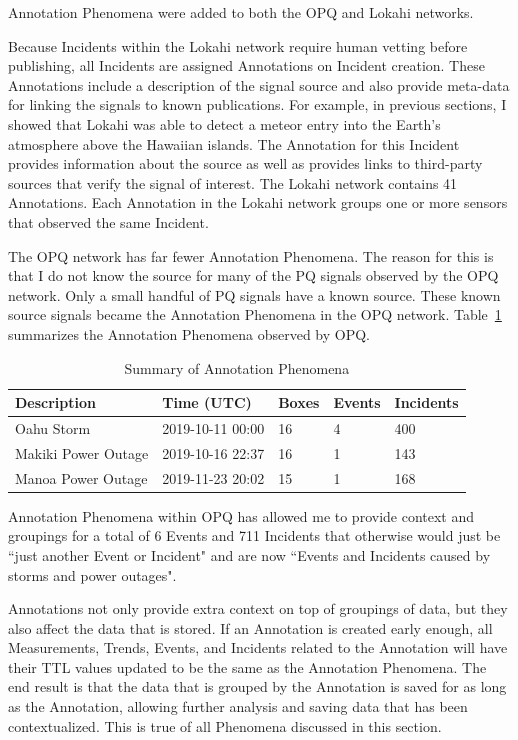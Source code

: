 Annotation Phenomena were added to both the OPQ and Lokahi networks.

Because Incidents within the Lokahi network require human vetting before publishing, all Incidents are assigned Annotations on Incident creation. These Annotations include a description of the signal source and also provide meta-data for linking the signals to known publications. For example, in previous sections, I showed that Lokahi was able to detect a meteor entry into the Earth's atmosphere above the Hawaiian islands. The Annotation for this Incident provides information about the source as well as provides links to third-party sources that verify the signal of interest. The Lokahi network contains 41 Annotations. Each Annotation in the Lokahi network groups one or more sensors that observed the same Incident.

The OPQ network has far fewer Annotation Phenomena. The reason for this is that I do not know the source for many of the PQ signals observed by the OPQ network. Only a small handful of PQ signals have a known source. These known source signals became the Annotation Phenomena in the OPQ network. Table~\ref{table:annotation_summary} summarizes the Annotation Phenomena observed by OPQ.

\begin{table}[H]
    \centering
    \caption{Summary of Annotation Phenomena}
    \begin{tabularx}{\textwidth}{lllll}
        \toprule
        \textbf{Description} & \textbf{Time (UTC)} & \textbf{Boxes} & \textbf{Events} & \textbf{Incidents}  \\
        \midrule
        Oahu Storm & 2019-10-11 00:00 & 16 & 4 & 400 \\
        Makiki Power Outage & 2019-10-16 22:37 & 16 & 1 & 143 \\
        Manoa Power Outage & 2019-11-23 20:02 & 15 & 1 & 168 \\
        \bottomrule
    \end{tabularx}
    \label{table:annotation_summary}
\end{table}

Annotation Phenomena within OPQ has allowed me to provide context and groupings for a total of 6 Events and 711 Incidents that otherwise would just be ``just another Event or Incident" and are now ``Events and Incidents caused by storms and power outages".

Annotations not only provide extra context on top of groupings of data, but they also affect the data that is stored. If an Annotation is created early enough, all Measurements, Trends, Events, and Incidents related to the Annotation will have their TTL values updated to be the same as the Annotation Phenomena. The end result is that the data that is grouped by the Annotation is saved for as long as the Annotation, allowing further analysis and saving data that has been contextualized. This is true of all Phenomena discussed in this section.

